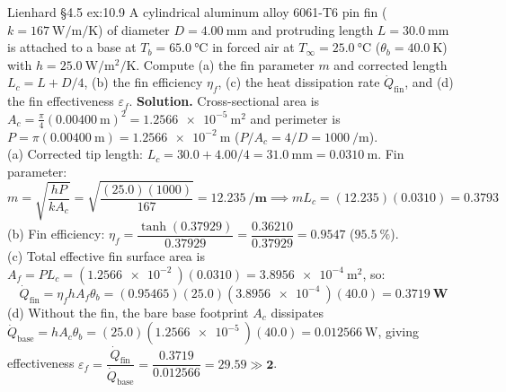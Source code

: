\begin{workedexample}{Lienhard §4.5 }{ex:10.9}
A cylindrical aluminum alloy 6061-T6 pin fin ($k = \SI{167}{\watt\per\meter\per\kelvin}$) of diameter $D = \SI{4.00}{\milli\meter}$ and protruding length $L = \SI{30.0}{\milli\meter}$ is attached to a base at $T_b = \SI{65.0}{\celsius}$ in forced air at $T_\infty = \SI{25.0}{\celsius}$ ($\theta_b = \SI{40.0}{\kelvin}$) with $h = \SI{25.0}{\watt\per\square\meter\per\kelvin}$. Compute (a) the fin parameter $m$ and corrected length $L_c = L + D/4$, (b) the fin efficiency $\eta_f$, (c) the heat dissipation rate $\dot{Q}_{\mathrm{fin}}$, and (d) the fin effectiveness $\varepsilon_f$.
\tcblower
\textbf{Solution.} Cross-sectional area is $A_c = \frac{\pi}{4}(\SI{0.00400}{\meter})^2 = \SI{1.2566e-5}{\square\meter}$ and perimeter is $P = \pi(\SI{0.00400}{\meter}) = \SI{1.2566e-2}{\meter}$ ($P/A_c = 4/D = \SI{1000}{\per\meter}$).\\
(a) Corrected tip length: $L_c = 30.0 + 4.00/4 = \SI{31.0}{\milli\meter} = \SI{0.0310}{\meter}$. Fin parameter:
\[
  m = \sqrt{\frac{h P}{k A_c}} = \sqrt{\frac{(25.0)(1000)}{167}} = \mathbf{\SI{12.235}{\per\meter}} \implies m L_c = (12.235)(0.0310) = \mathbf{0.3793}
\]
(b) Fin efficiency: $\eta_f = \dfrac{\tanh(0.37929)}{0.37929} = \dfrac{0.36210}{0.37929} = \mathbf{0.9547}$ ($\SI{95.5}{\percent}$).\\
(c) Total effective fin surface area is $A_f = P L_c = (\SI{1.2566e-2}{})(0.0310) = \SI{3.8956e-4}{\square\meter}$, so:
\[
  \dot{Q}_{\mathrm{fin}} = \eta_f h A_f \theta_b = (0.95465)(25.0)(\SI{3.8956e-4}{})(40.0) = \mathbf{\SI{0.3719}{\watt}}
\]
(d) Without the fin, the bare base footprint $A_c$ dissipates $\dot{Q}_{\mathrm{base}} = h A_c \theta_b = (25.0)(\SI{1.2566e-5}{})(40.0) = \SI{0.012566}{\watt}$, giving effectiveness $\varepsilon_f = \dfrac{\dot{Q}_{\mathrm{fin}}}{\dot{Q}_{\mathrm{base}}} = \dfrac{0.3719}{0.012566} = \mathbf{29.59 \gg 2}$.
\end{workedexample}

